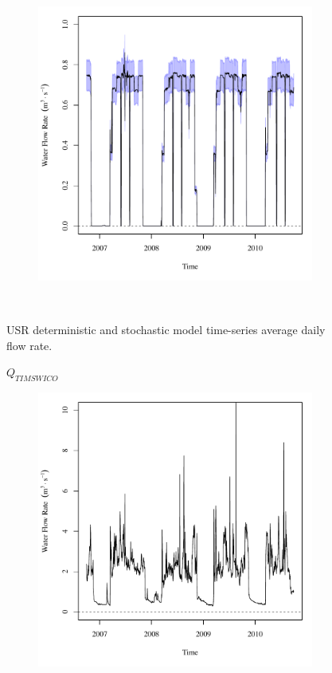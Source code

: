 \begin{linenumbers}
\begin{landscape}
\begin{figure}
\begin{subfigure}{0.7\textwidth}
			\includegraphics[width=\tableCustomSize]{"Figures/Results_USR/Stochastic/Q RFR"}
		\end{subfigure}\\
		\caption{USR deterministic and stochastic model time-series average daily flow rate.}
	\end{figure}
\end{landscape}
\subfiguremid
\begin{landscape}
	\begin{figure}
		\centering
		$ Q_{TIMSWICO} $
		\begin{subfigure}{0.7\textwidth}
			\centering
			\includegraphics[width=\tableCustomSize]{"Figures/Results_USR/Deterministic/Q TIM"}

\end{subfigure}
\end{figure}
\end{landscape}
\end{linenumbers}
